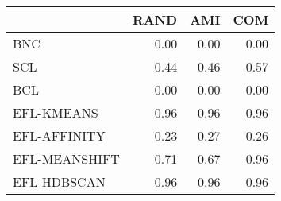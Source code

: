 \begin{tabular}{lrrr}
\toprule
 & RAND & AMI & COM \\
\midrule
BNC & 0.00 & 0.00 & 0.00 \\
SCL & 0.44 & 0.46 & 0.57 \\
BCL & 0.00 & 0.00 & 0.00 \\
EFL-KMEANS & 0.96 & 0.96 & 0.96 \\
EFL-AFFINITY & 0.23 & 0.27 & 0.26 \\
EFL-MEANSHIFT & 0.71 & 0.67 & 0.96 \\
EFL-HDBSCAN & 0.96 & 0.96 & 0.96 \\
\bottomrule
\end{tabular}
